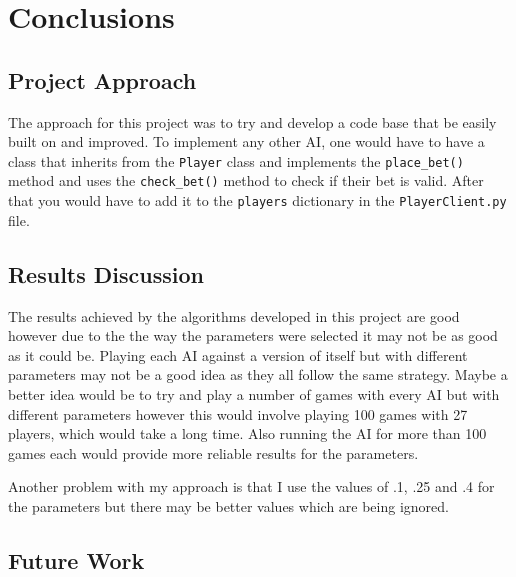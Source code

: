 \chapter{Conclusions}

\section{Project Approach}

The approach for this project was to try and develop a code base that be easily built on and improved. To implement any other AI, one would have to have a class that inherits from the \texttt{Player} class and implements the \texttt{place\_bet()} method and uses the \texttt{check\_bet()} method to check if their bet is valid. After that you would have to add it to the \texttt{players} dictionary in the \texttt{PlayerClient.py} file.

\section{Results Discussion}

The results achieved by the algorithms developed in this project are good however due to the the way the parameters were selected it may not be as good as it could be. Playing each AI against a version of itself but with different parameters may not be a good idea as they all follow the same strategy. Maybe a better idea would be to try and play a number of games with every AI but with different parameters however this would involve playing 100 games with 27 players, which would take a long time. Also running the AI for more than 100 games each would provide more reliable results for the parameters.

Another problem with my approach is that I use the values of .1, .25 and .4 for the parameters but there may be better values which are being ignored.

\section{Future Work}

